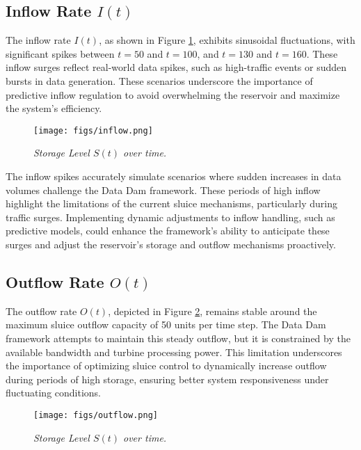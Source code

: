 \subsection{Inflow Rate \( I(t) \)}
The inflow rate \( I(t) \), as shown in Figure \ref{fig:inflow}, exhibits sinusoidal fluctuations, with significant spikes between \( t = 50 \) and \( t = 100 \), and \( t = 130 \) and \( t = 160 \). These inflow surges reflect real-world data spikes, such as high-traffic events or sudden bursts in data generation. These scenarios underscore the importance of predictive inflow regulation to avoid overwhelming the reservoir and maximize the system's efficiency.

\begin{figure}[H] %
    \centering
        \texttt{[image: figs/inflow.png]} %
        \caption{\textit{Storage Level \( S(t) \) over time.}} %
        \label{fig:inflow}
 
\end{figure}

The inflow spikes accurately simulate scenarios where sudden increases in data volumes challenge the Data Dam framework. These periods of high inflow highlight the limitations of the current sluice mechanisms, particularly during traffic surges. Implementing dynamic adjustments to inflow handling, such as predictive models, could enhance the framework's ability to anticipate these surges and adjust the reservoir's storage and outflow mechanisms proactively.

\subsection{Outflow Rate \( O(t) \)}
The outflow rate \( O(t) \), depicted in Figure \ref{fig:outflow}, remains stable around the maximum sluice outflow capacity of 50 units per time step. The Data Dam framework attempts to maintain this steady outflow, but it is constrained by the available bandwidth and turbine processing power. This limitation underscores the importance of optimizing sluice control to dynamically increase outflow during periods of high storage, ensuring better system responsiveness under fluctuating conditions.


\begin{figure}[H] %
    \centering
        \texttt{[image: figs/outflow.png]} %
        \caption{\textit{Storage Level \( S(t) \) over time.}} %
        \label{fig:outflow}
 
\end{figure}

